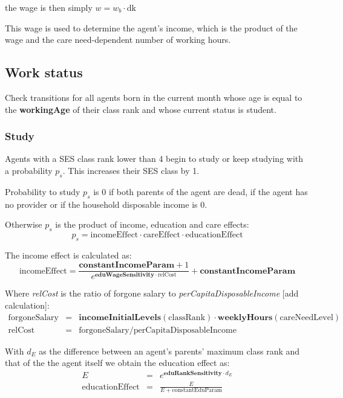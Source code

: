 \documentclass{article}
\begin{document}
the wage is then simply $w=w_b \cdot \mathrm{dk}$

This wage is used to determine the agent's income, which is the product of the wage and the care need-dependent number of working hours.

\subsection{Work status}

Check transitions for all agents born in the current month whose age is 
equal to the \textbf{workingAge} of their class rank and whose current status is student.


\subsubsection*{Study}

Agents with a SES class rank lower than 4 begin to study or keep studying with a probability $p_s$. This increases their SES class by 1. 

Probability to study $p_s$ is 0 if both parents of the agent are dead, if the agent has no provider or if the household disposable income is 0.

Otherwise $p_s$ is the product of income, education and care effects:
\[
p_s = \mathrm{incomeEffect} \cdot \mathrm{careEffect} \cdot \mathrm{educationEffect}
\]

The income effect is calculated as:
\[
\mathrm{incomeEffect} = \frac{\mathbf{constantIncomeParam} + 1}{ 
e^{\mathbf{eduWageSensitivity} \cdot \mathrm{relCost}}} + \mathbf{constantIncomeParam}
\]

Where \textit{relCost} is the ratio of forgone salary to \textit{perCapitaDisposableIncome} [add calculation]:
\begin{eqnarray*}
\mathrm{forgoneSalary} &=& \mathbf{incomeInitialLevels}(\mathrm{classRank}) \cdot 
\mathbf{weeklyHours}(\mathrm{careNeedLevel})\\
\mathrm{relCost} &=& \mathrm{forgoneSalary} / \mathrm{perCapitaDisposableIncome}
\end{eqnarray*}

With $d_E$ as the difference between an agent's parents' maximum class rank and that of the the agent 
itself we obtain the education effect as:
\begin{eqnarray*}
E &=& e^{\mathbf{eduRankSensitivity}\cdot d_E}\\
\mathrm{educationEffect} &=& \frac{E}{E + \mathrm{constantEduParam}}
\end{eqnarray*}
\end{document}
